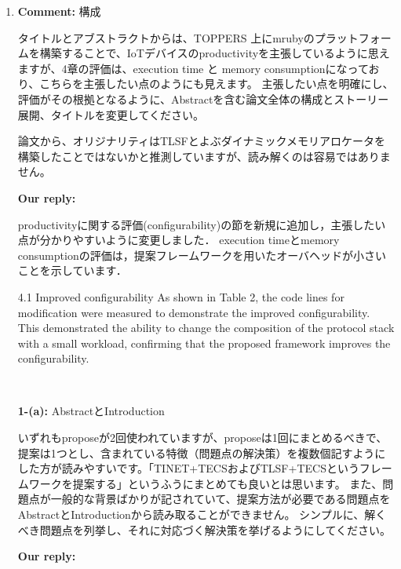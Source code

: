 \documentclass{article}
\begin{document}
\begin{enumerate}

\item \begin{flushleft}
\textbf{Comment:} 構成

タイトルとアブストラクトからは、TOPPERS 上にmrubyのプラットフォームを構築することで、IoTデバイスのproductivityを主張しているように思えますが、4章の評価は、execution time と memory consumptionになっており、こちらを主張したい点のようにも見えます。
主張したい点を明確にし、評価がその根拠となるように、Abstractを含む論文全体の構成とストーリー展開、タイトルを変更してください。

論文から、オリジナリティはTLSFとよぶダイナミックメモリアロケータを構築したことではないかと推測していますが、読み解くのは容易ではありません。
\end{flushleft}
\begin{flushleft}
\textbf{Our reply:}

productivityに関する評価(configurability)の節を新規に追加し，主張したい点が分かりやすいように変更しました．
execution timeとmemory consumptionの評価は，提案フレームワークを用いたオーバヘッドが小さいことを示しています．

\begin{itembox}[|]{4.1 Improved configurability}
As shown in Table 2, the code lines for modification were measured to demonstrate the improved configurability.
This demonstrated the ability to change the composition of the protocol stack with a small workload, confirming that the proposed framework improves the configurability.
\end{itembox}\\

\end{flushleft}

\begin{flushleft}
\textbf{1-(a):} AbstractとIntroduction

いずれもproposeが2回使われていますが、proposeは1回にまとめるべきで、提案は1つとし、含まれている特徴（問題点の解決策）を複数個記すようにした方が読みやすいです。「TINET+TECSおよびTLSF+TECSというフレームワークを提案する」というふうにまとめても良いとは思います。
また、問題点が一般的な背景ばかりが記されていて、提案方法が必要である問題点をAbstractとIntroductionから読み取ることができません。
シンプルに、解くべき問題点を列挙し、それに対応づく解決策を挙げるようにしてください。
\end{flushleft}
\begin{flushleft}
\textbf{Our reply:}


\end{flushleft}
\end{enumerate}
\end{document}
